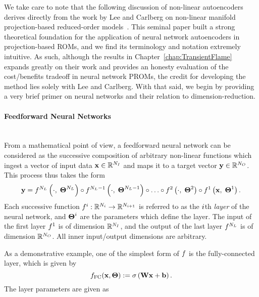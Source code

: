 We take care to note that the following discussion of non-linear autoencoders derives directly from the work by Lee and Carlberg on non-linear manifold projection-based reduced-order models~\cite{Lee2020}. This seminal paper built a strong theoretical foundation for the application of neural network autoencoders in projection-based ROMs, and we find its terminology and notation extremely intuitive. As such, although the results in Chapter~\ref{chap:TransientFlame} expands greatly on their work and provides an honesty evaluation of the cost/benefits tradeoff in neural network PROMs, the credit for developing the method lies solely with Lee and Carlberg. With that said, we begin by providing a very brief primer on neural networks and their relation to dimension-reduction.

\paragraph*{Feedforward Neural Networks}\mbox{}\\
%
From a mathematical point of view, a feedforward neural network can be considered as the successive composition of arbitrary non-linear functions which ingest a vector of input data $\nnInput \inROne{\numNNInput}$ and maps it to a target vector $\nnOutput \inROne{\numNNOutput}$. This process thus takes the form
%
\begin{equation}
	\nnOutput = \nnLayerFuncIdx{\cdot, \; \nnParams^{\numLayers}}{\numLayers} \circ \nnLayerFuncIdx{\cdot, \; \nnParams^{\numLayers-1}}{\numLayers-1} \circ \hdots \circ \nnLayerFuncIdx{\cdot, \; \nnParams^{2}}{2} \circ \nnLayerFuncIdx{\nnInput, \; \nnParams^{1}}{1}.
\end{equation}
%
Each successive function $\funcMap{\nnLayerIdx{\dummyIdx}}{\ROne{N_{\dummyIdx}}}{\ROne{N_{\dummyIdx+1}}}$ is referred to as the $\dummyIdx$th \textit{layer} of the neural network, and $\nnParams^{\dummyIdx}$ are the parameters which define the layer. The input of the first layer $\nnLayer^1$ is of dimension $\ROne{\numNNInput}$, and the output of the last layer $\nnLayer^{\numLayers}$ is of dimension $\ROne{\numNNOutput}$. All inner input/output dimensions are arbitrary.

As a demonstrative example, one of the simplest form of $\nnLayer$ is the fully-connected layer, which is given by
%
\begin{equation}
	\nnLayer_{\text{FC}}(\nnInput, \nnParams) \defEq \actFunc{\nnWeights \nnInput + \nnBias}.
\end{equation}
%
The layer parameters are given as

